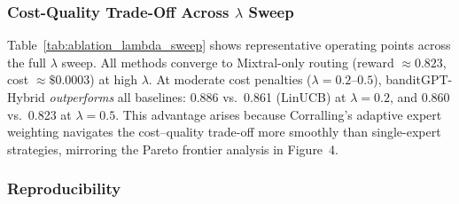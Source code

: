 \subsubsection{Cost-Quality Trade-Off Across $\lambda$ Sweep}

Table~\ref{tab:ablation_lambda_sweep} shows representative operating points
across the full $\lambda$ sweep.  All methods converge to Mixtral-only
routing (reward ${\approx}0.823$, cost ${\approx}\$0.0003$) at high $\lambda$.
At moderate cost penalties ($\lambda{=}0.2$--$0.5$), banditGPT-Hybrid
\emph{outperforms} all baselines: 0.886 vs.\ 0.861 (LinUCB) at
$\lambda{=}0.2$, and 0.860 vs.\ 0.823 at $\lambda{=}0.5$.  This advantage
arises because Corralling's adaptive expert weighting navigates the
cost--quality trade-off more smoothly than single-expert strategies,
mirroring the Pareto frontier analysis in Figure~4.

\begin{table}[h]
\centering
\caption{Reward at selected $\lambda$ values (mean, 20 seeds).}
\label{tab:ablation_lambda_sweep}
\small
{}
\end{table}

\subsubsection{Reproducibility}

